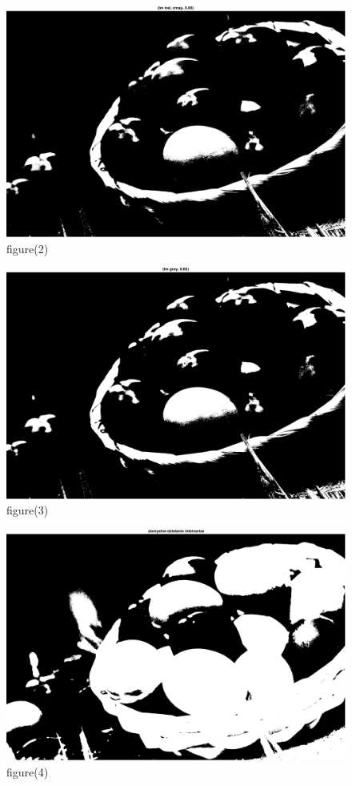 \documentclass[10pt,a4paper,twoside]{article}%
\begin{document}
\begin{figure}[H]
    \centering
    \includegraphics[width=0.8\linewidth]{kod matlab/myVectorFile2.pdf}
\caption{figure(2)}
    \label{fig:obr1}
\end{figure}

\begin{figure}[H]
    \centering
    \includegraphics[width=1\linewidth]{kod matlab/myVectorFile3.pdf}
\caption{figure(3)}
\end{figure}

\begin{figure}[H]
    \centering
    \includegraphics[width=1\linewidth]{kod matlab/myVectorFile4.pdf}
\caption{figure(4)}
    \label{fig:obr1}
\end{figure}
\end{document}
